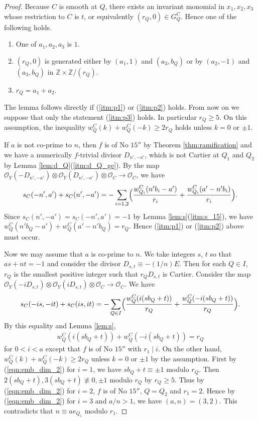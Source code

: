 \documentclass[a4paper,11pt]{amsart}
\theoremstyle{definition}
\theoremstyle{remark}
\numberwithin{equation}{section}
\newcommand{\bZ}{{\mathbb Z}}
\newcommand{\cO}{{\mathcal O}}
\begin{document}
\begin{proof}
Because $C$ is smooth at $Q$,
there exists an invariant monomial in $x_1,x_2,x_3$
whose restriction to $C$ is $t$,
or equivalently $(r_Q,0) \in G_Q^C$.
Hence one of the following holds.
\begin{enumerate}
\item\label{itm:p1}
One of $a_1,a_2,a_3$ is $1$.
\item\label{itm:p2}
$(r_Q, 0)$ is generated either by $(a_1,1)$ and $(a_3,b_Q)$
or by $(a_2,-1)$ and $(a_3,b_Q)$ in $\bZ \times \bZ/(r_Q)$.
\item\label{itm:p3}
$r_Q=a_1+a_2$.
\end{enumerate}
The lemma follows directly if (\ref{itm:p1}) or (\ref{itm:p2}) holds.
From now on we suppose that only the statement (\ref{itm:p3}) holds.
In particular $r_Q \ge 5$.
On this assumption,
the inequality $w_Q^C(k)+w_Q^C(-k) \ge 2r_Q$ holds unless $k=0$ or $\pm1$.

If $a$ is not co-prime to $n$,
then $f$ is of No $\textrm{15}''$ by Theorem \ref{thm:ramification}
and we have a numerically $f$-trivial divisor $D_{n',-a'}$,
which is not Cartier at $Q_1$ and $Q_2$
by Lemma \ref{lem:d_Q}(\ref{itm:d_Q_ge}).
By the map
$\cO_Y(-D_{n',-a'}) \otimes \cO_Y(D_{n',-a'}) \otimes \cO_C \to \cO_C$,
we have
\begin{align*}
s_C(-n',a')+s_C(n',-a')=
-\sum_{i=1,2}
\Bigl(\frac{w_{Q_i}^C(n'b_i-a')}{r_i}+\frac{w_{Q_i}^C(a'-n'b_i)}{r_i}\Bigr).
\end{align*}
Since $s_C(n',-a')=s_C(-n',a')=-1$ by Lemma \ref{lem:s}(\ref{itm:s_15}),
we have $w_Q^C(n'b_Q-a')+w_Q^C(a'-n'b_Q)=r_Q$.
Hence (\ref{itm:p1}) or (\ref{itm:p2}) above must occur.

Now we may assume that $a$ is co-prime to $n$.
We take integers $s$, $t$ so that $as+nt=-1$
and consider the divisor $D_{s,t} \equiv -(1/n)E$.
Then for each $Q \in I$,
$r_Q$ is the smallest positive integer such that $r_QD_{s,t}$ is Cartier.
Consider the map
$\cO_Y(-iD_{s,t}) \otimes \cO_Y(iD_{s,t}) \otimes \cO_C \to \cO_C$.
We have
\begin{align*}
s_C(-is,-it)+s_C(is,it)=
-\sum_{Q \in I}
\Bigl(\frac{w_Q^C(i(sb_Q+t))}{r_Q}+\frac{w_Q^C(-i(sb_Q+t))}{r_Q}\Bigr).
\end{align*}
By this equality and Lemma \ref{lem:s},
\begin{align}\label{eqn:emb_dim_2}
w_Q^C(i(sb_Q+t))+w_Q^C(-i(sb_Q+t))=r_Q
\end{align}
for $0<i<a$ except that $f$ is of No $\textrm{15}''$ with $r_1 \mid i$.
On the other hand,
$w_Q^C(k)+w_Q^C(-k) \ge 2r_Q$ unless $k=0$ or $\pm1$ by the assumption.
First by (\ref{eqn:emb_dim_2}) for $i=1$,
we have $sb_Q+t \equiv \pm1$ modulo $r_Q$.
Then $2(sb_Q+t), 3(sb_Q+t) \not\equiv 0, \pm1$ modulo $r_Q$ by $r_Q\ge5$.
Thus by (\ref{eqn:emb_dim_2}) for $i=2$,
$f$ is of No $\textrm{15}''$, $Q=Q_2$ and $r_1=2$.
Hence by (\ref{eqn:emb_dim_2}) for $i=3$ and $a/n>1$,
we have $(a,n)=(3,2)$.
This contradicts that $n\equiv ae_{Q_1}$ modulo $r_1$.
\end{proof}
\end{document}
